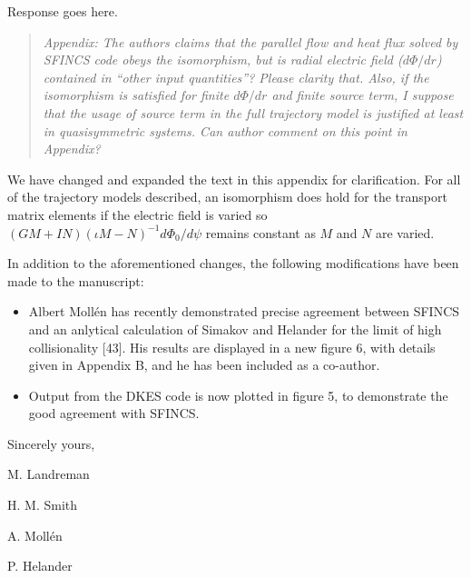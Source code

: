 \documentclass[11pt]{article}
\newenvironment{referee}{\begin{quote}\it\color{Blue}}{\end{quote}}
\begin{document}
Response goes here.

\begin{referee}
Appendix: The authors claims that the parallel flow and heat flux solved by SFINCS code obeys the
isomorphism, but is radial electric field ($d\Phi/dr$) contained in ``other input quantities''? Please
clarity that. Also, if the isomorphism is satisfied for finite $d\Phi/dr$ and finite source term, I
suppose that the usage of source term in the full trajectory model is justified at least in
quasisymmetric systems. Can author comment on this point in Appendix?
\end{referee}

We have changed and expanded the text in this appendix for clarification. 
For all of the trajectory models described, an isomorphism does hold for the transport matrix elements
if the electric field is varied so
$(GM+IN)(\iota M-N)^{-1} d\Phi_0/d\psi$ remains constant as $M$ and $N$ are varied.
\vspace{0.3in}


In addition to the aforementioned changes, the following modifications have been made to the manuscript:

\begin{itemize}
\item Albert Moll\'{e}n has recently demonstrated precise agreement between SFINCS and an anlytical calculation
of Simakov and Helander for the limit of high collisionality [43]. His results are displayed in a new figure 6, with details given in Appendix B,
 and he has been included as a co-author.
\item Output from the DKES code is now plotted in figure 5, to demonstrate the good agreement with SFINCS.
\end{itemize}


Sincerely yours,\newline

M. Landreman

H. M. Smith

A. Moll\'{e}n

P. Helander
\end{document}
